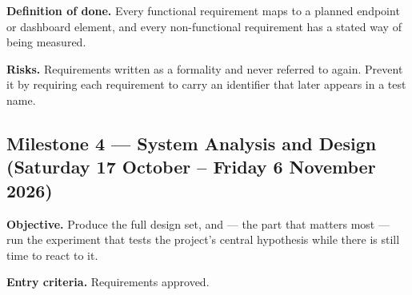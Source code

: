 \documentclass[11pt,a4paper]{article}
\begin{document}
\textbf{Definition of done.} Every functional requirement maps to a planned endpoint or dashboard
element, and every non-functional requirement has a stated way of being measured.

\textbf{Risks.} Requirements written as a formality and never referred to again. Prevent it by
requiring each requirement to carry an identifier that later appears in a test name.

\subsection{Milestone 4 --- System Analysis and Design (Saturday 17 October -- Friday 6 November 2026)}

\textbf{Objective.} Produce the full design set, and --- the part that matters most --- run the
experiment that tests the project's central hypothesis while there is still time to react to it.

\textbf{Entry criteria.} Requirements approved.
\end{document}
